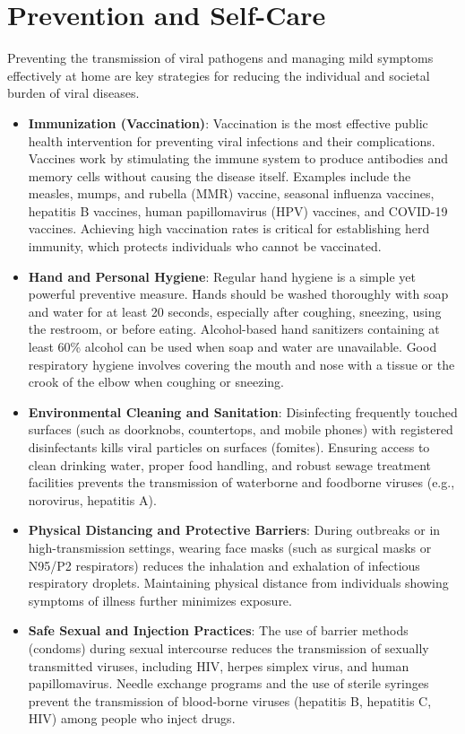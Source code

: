 \section*{Prevention and Self-Care}
Preventing the transmission of viral pathogens and managing mild symptoms effectively at home are key strategies for reducing the individual and societal burden of viral diseases.
\begin{itemize}
    \item \textbf{Immunization (Vaccination)}: Vaccination is the most effective public health intervention for preventing viral infections and their complications. Vaccines work by stimulating the immune system to produce antibodies and memory cells without causing the disease itself. Examples include the measles, mumps, and rubella (MMR) vaccine, seasonal influenza vaccines, hepatitis B vaccines, human papillomavirus (HPV) vaccines, and COVID-19 vaccines. Achieving high vaccination rates is critical for establishing herd immunity, which protects individuals who cannot be vaccinated.
    \item \textbf{Hand and Personal Hygiene}: Regular hand hygiene is a simple yet powerful preventive measure. Hands should be washed thoroughly with soap and water for at least 20 seconds, especially after coughing, sneezing, using the restroom, or before eating. Alcohol-based hand sanitizers containing at least 60\% alcohol can be used when soap and water are unavailable. Good respiratory hygiene involves covering the mouth and nose with a tissue or the crook of the elbow when coughing or sneezing.
    \item \textbf{Environmental Cleaning and Sanitation}: Disinfecting frequently touched surfaces (such as doorknobs, countertops, and mobile phones) with registered disinfectants kills viral particles on surfaces (fomites). Ensuring access to clean drinking water, proper food handling, and robust sewage treatment facilities prevents the transmission of waterborne and foodborne viruses (e.g., norovirus, hepatitis A).
    \item \textbf{Physical Distancing and Protective Barriers}: During outbreaks or in high-transmission settings, wearing face masks (such as surgical masks or N95/P2 respirators) reduces the inhalation and exhalation of infectious respiratory droplets. Maintaining physical distance from individuals showing symptoms of illness further minimizes exposure.
    \item \textbf{Safe Sexual and Injection Practices}: The use of barrier methods (condoms) during sexual intercourse reduces the transmission of sexually transmitted viruses, including HIV, herpes simplex virus, and human papillomavirus. Needle exchange programs and the use of sterile syringes prevent the transmission of blood-borne viruses (hepatitis B, hepatitis C, HIV) among people who inject drugs.

\end{itemize}
